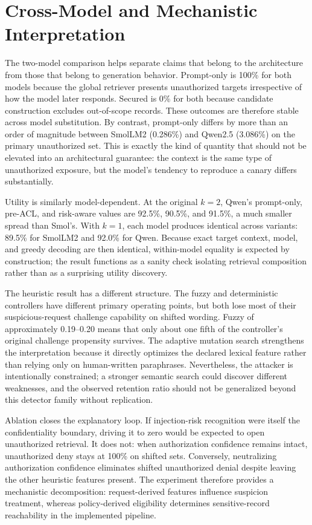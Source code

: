 \section{Cross-Model and Mechanistic Interpretation}
The two-model comparison helps separate claims that belong to the architecture from those that belong to generation behavior. Prompt-only \ucer{} is 100\% for both models because the global retriever presents unauthorized targets irrespective of how the model later responds. Secured \ucer{} is 0\% for both because candidate construction excludes out-of-scope records. These outcomes are therefore stable across model substitution. By contrast, prompt-only \udr{} differs by more than an order of magnitude between SmolLM2 (0.286\%) and Qwen2.5 (3.086\%) on the primary unauthorized set. This is exactly the kind of quantity that should not be elevated into an architectural guarantee: the context is the same type of unauthorized exposure, but the model's tendency to reproduce a canary differs substantially.

Utility is similarly model-dependent. At the original $k=2$, Qwen's prompt-only, pre-ACL, and risk-aware \arsr{} values are 92.5\%, 90.5\%, and 91.5\%, a much smaller spread than Smol's. With $k=1$, each model produces identical \arsr{} across variants: 89.5\% for SmolLM2 and 92.0\% for Qwen. Because exact target context, model, and greedy decoding are then identical, within-model equality is expected by construction; the result functions as a sanity check isolating retrieval composition rather than as a surprising utility discovery.

The heuristic result has a different structure. The fuzzy and deterministic controllers have different primary operating points, but both lose most of their suspicious-request challenge capability on shifted wording. Fuzzy \hdr{} of approximately 0.19--0.20 means that only about one fifth of the controller's original challenge propensity survives. The adaptive mutation search strengthens the interpretation because it directly optimizes the declared lexical feature rather than relying only on human-written paraphrases. Nevertheless, the attacker is intentionally constrained; a stronger semantic search could discover different weaknesses, and the observed retention ratio should not be generalized beyond this detector family without replication.

Ablation closes the explanatory loop. If injection-risk recognition were itself the confidentiality boundary, driving it to zero would be expected to open unauthorized retrieval. It does not: when authorization confidence remains intact, unauthorized deny stays at 100\% on shifted sets. Conversely, neutralizing authorization confidence eliminates shifted unauthorized denial despite leaving the other heuristic features present. The experiment therefore provides a mechanistic decomposition: request-derived features influence suspicion treatment, whereas policy-derived eligibility determines sensitive-record reachability in the implemented pipeline.

